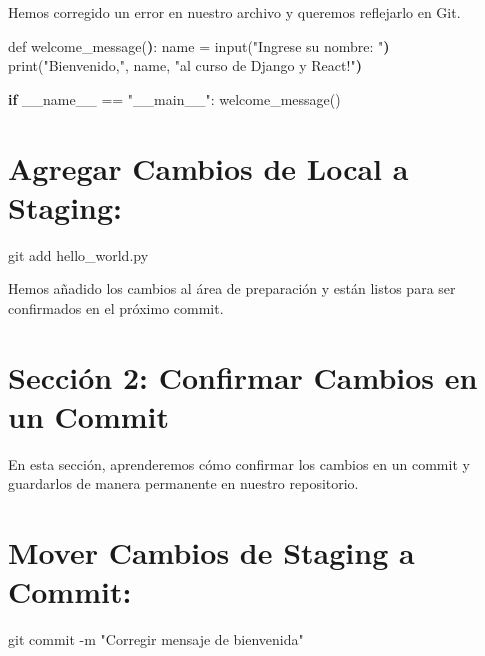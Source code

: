 \documentclass[
  a4paper,
  DIV=11,
  numbers=noendperiod,
  onepage,
  openany]{scrreprt}
\newenvironment{Shaded}{\begin{snugshade}}{\end{snugshade}}
\newcommand{\AttributeTok}[1]{\textcolor[rgb]{0.40,0.45,0.13}{#1}}
\newcommand{\BuiltInTok}[1]{\textcolor[rgb]{0.00,0.23,0.31}{#1}}
\newcommand{\ControlFlowTok}[1]{\textcolor[rgb]{0.00,0.23,0.31}{\textbf{#1}}}
\newcommand{\ErrorTok}[1]{\textcolor[rgb]{0.68,0.00,0.00}{#1}}
\newcommand{\ExtensionTok}[1]{\textcolor[rgb]{0.00,0.23,0.31}{#1}}
\newcommand{\FunctionTok}[1]{\textcolor[rgb]{0.28,0.35,0.67}{#1}}
\newcommand{\KeywordTok}[1]{\textcolor[rgb]{0.00,0.23,0.31}{\textbf{#1}}}
\newcommand{\NormalTok}[1]{\textcolor[rgb]{0.00,0.23,0.31}{#1}}
\newcommand{\StringTok}[1]{\textcolor[rgb]{0.13,0.47,0.30}{#1}}
\begin{document}
Hemos corregido un error en nuestro archivo y queremos reflejarlo en
Git.

\begin{Shaded}
\begin{Highlighting}[]
\ExtensionTok{def}\NormalTok{ welcome\_message}\ErrorTok{(}\KeywordTok{)}\BuiltInTok{:}
    \ExtensionTok{name}\NormalTok{ = input}\ErrorTok{(}\StringTok{"Ingrese su nombre: "}\KeywordTok{)}
    \ExtensionTok{print}\ErrorTok{(}\StringTok{"Bienvenido,"}\ExtensionTok{,}\NormalTok{ name, }\StringTok{"al curso de Django y React!"}\KeywordTok{)}

\ControlFlowTok{if} \ExtensionTok{\_\_name\_\_}\NormalTok{ == }\StringTok{"\_\_main\_\_"}\NormalTok{:}
    \FunctionTok{welcome\_message()}
\end{Highlighting}
\end{Shaded}

\section{Agregar Cambios de Local a
Staging:}\label{agregar-cambios-de-local-a-staging}

\begin{Shaded}
\begin{Highlighting}[]
\FunctionTok{git}\NormalTok{ add hello\_world.py}
\end{Highlighting}
\end{Shaded}

Hemos añadido los cambios al área de preparación y están listos para ser
confirmados en el próximo commit.

\section{Sección 2: Confirmar Cambios en un
Commit}\label{secciuxf3n-2-confirmar-cambios-en-un-commit}

En esta sección, aprenderemos cómo confirmar los cambios en un commit y
guardarlos de manera permanente en nuestro repositorio.

\section{Mover Cambios de Staging a
Commit:}\label{mover-cambios-de-staging-a-commit}

\begin{Shaded}
\begin{Highlighting}[]
\FunctionTok{git}\NormalTok{ commit }\AttributeTok{{-}m} \StringTok{"Corregir mensaje de bienvenida"}
\end{Highlighting}
\end{Shaded}
\end{document}
